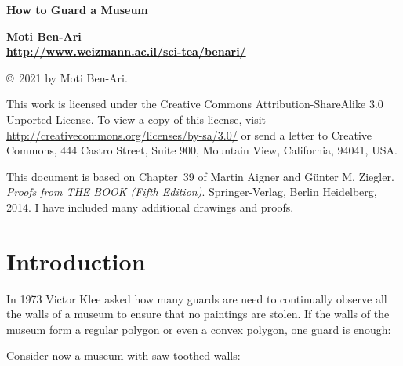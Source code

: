 \documentclass[11pt,a4paper]{article}
\begin{document}
\thispagestyle{empty}
\begin{center}
\textbf{\LARGE How to Guard a Museum}

\bigskip

\textbf{\Large Moti Ben-Ari\\\bigskip\url{http://www.weizmann.ac.il/sci-tea/benari/}}


\medskip
\end{center}


\begin{footnotesize}
\begin{center}
\copyright{}\  2021 by Moti Ben-Ari. 
\end{center}
This work is licensed under the Creative Commons Attribution-ShareAlike 3.0 Unported License. To view a copy of this license, visit \url{http://creativecommons.org/licenses/by-sa/3.0/} or send a letter to Creative Commons, 444 Castro Street, Suite 900, Mountain View, California, 94041, USA.

\end{footnotesize}

\bigskip

This document is based on Chapter~39 of Martin Aigner and Günter M. Ziegler. \textit{Proofs from THE BOOK (Fifth Edition)}. Springer-Verlag, Berlin Heidelberg, 2014. I have included many additional drawings and proofs.

\section{Introduction}
In 1973 Victor Klee asked how many guards are need to continually observe all the walls of a museum to ensure that no paintings are stolen. If the walls of the museum form a regular polygon or even a convex polygon, one guard is enough:

\begin{center}
\end{center}

Consider now a museum with saw-toothed walls:
\end{document}
